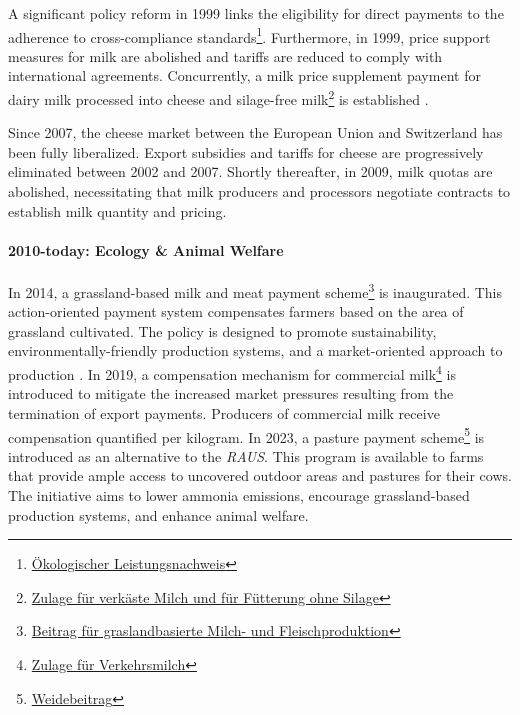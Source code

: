 A significant policy reform in 1999 links the eligibility for direct payments to the adherence to cross-compliance standards\footnote{\href{https://www.blw.admin.ch/blw/de/home/instrumente/direktzahlungen/oekologischer-leistungsnachweis.html}{Ökologischer Leistungsnachweis}}. Furthermore, in 1999, price support measures for milk are abolished and tariffs are reduced to comply with international agreements. Concurrently, a milk price supplement payment for dairy milk processed into cheese and silage-free milk\footnote{\href{https://www.blw.admin.ch/blw/de/home/nachhaltige-produktion/tierische-produktion/milch-und-milchprodukte/zulage-fuer-verkaeste-milch-und-fuer-fuetterung-ohne-silage.html}{Zulage für verkäste Milch und für Fütterung ohne Silage}} is established \citep{finger_swiss_2017}.

Since 2007, the cheese market between the European Union and Switzerland has been fully liberalized. Export subsidies and tariffs for cheese are progressively eliminated between 2002 and 2007. Shortly thereafter, in 2009, milk quotas are abolished, necessitating that milk producers and processors negotiate contracts to establish milk quantity and pricing.

\paragraph{2010-today: Ecology \& Animal Welfare}
In 2014, a grassland-based milk and meat payment scheme\footnote{\href{https://www.blw.admin.ch/blw/de/home/instrumente/direktzahlungen/produktionssystembeitraege23/beitrag-fuer-graslandbasierte-milch--und-fleischproduktion.html}{Beitrag für graslandbasierte Milch- und Fleischproduktion}} is inaugurated. This action-oriented payment system compensates farmers based on the area of grassland cultivated. The policy is designed to promote sustainability, environmentally-friendly production systems, and a market-oriented approach to production \citep{mack_evaluation_2017}. In 2019, a compensation mechanism for commercial milk\footnote{\href{https://www.blw.admin.ch/blw/de/home/nachhaltige-produktion/tierische-produktion/milch-und-milchprodukte/zulagefuerverkehrsmilch.html}{Zulage für Verkehrsmilch}} is introduced to mitigate the increased market pressures resulting from the termination of export payments. Producers of commercial milk receive compensation quantified per kilogram. In 2023, a pasture payment scheme\footnote{\href{https://www.blw.admin.ch/blw/de/home/instrumente/direktzahlungen/produktionssystembeitraege23/tierwohlbeitraege1.html}{Weidebeitrag}} is introduced as an alternative to the \textit{RAUS}. This program is available to farms that provide ample access to uncovered outdoor areas and pastures for their cows. The initiative aims to lower ammonia emissions, encourage grassland-based production systems, and enhance animal welfare.
